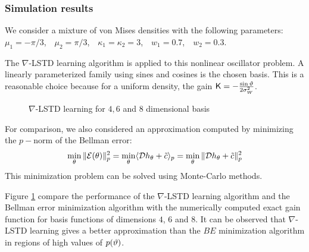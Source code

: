 \subsubsection*{Simulation results}
We consider a mixture of von Mises densities with the following parameters: $\mu_1 = -\pi/3$,\ \
$\mu_2 = \pi/3$,\ \
$\kappa_1=\kappa_2=3$,\ \
$w_1 =0.7$,\ \
$w_2 =0.3$.


The $\nabla$-LSTD learning algorithm is applied to this nonlinear oscillator problem. A linearly parameterized family using sines and cosines is the chosen basis. This is a reasonable choice because for a uniform density, the gain $\text{\sf K}=-\frac{\sin \vartheta}{2\sigma_{W}^{2}}$.

\begin{figure}
	\caption{$\nabla$-LSTD learning for $4,6$ and $8$ dimensional basis}
	\label{f:qad468}
\end{figure}

For comparison, we also considered an approximation computed by minimizing the $p-$norm of the Bellman error:
\begin{align*}
\min_{\theta}\|{\cal E}(\theta)\|_{p}^{2}=\min_{\theta}\langle {\cal D} h_{\theta} + \tilde c \rangle_{p} = \min_{\theta}\|{\cal D} h_{\theta} +\tilde c \|_{p}^{2}
\end{align*}
This minimization problem can be solved using Monte-Carlo methods.

Figure \ref{f:qad468} compare the performance of the $\nabla$-LSTD learning algorithm and the Bellman error minimization algorithm with the numerically computed exact gain function for basis functions of dimensions $4$, $6$ and $8$. It can be observed that $\nabla$-LSTD learning gives a better approximation than the $BE$ minimization algorithm in regions of high values of $p(\vartheta)$.




%
%
%
%

